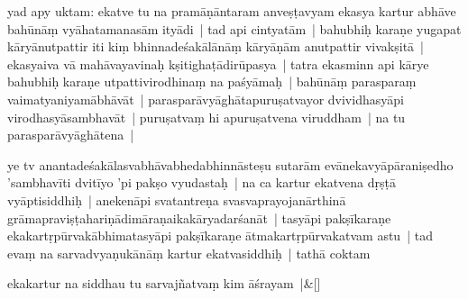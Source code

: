 \documentclass[article,a4paper]{memoir}
\begin{document}
	  \pstart yad apy uktam: \label{ratnakīrtinibandhāvali__36r1NSAZOF4PYRJJ9T4KL5GNBA4}ekatve tu na pramā\-ṇā\-ntaram anveṣṭavyam ekasya kartur abhā\-ve bahū\-nā\-ṃ vyā\-hatamanasā\-m ityā\-di\label{ratnakīrtinibandhāvali__36r1NSAZOF6VPMT1M1P47SSA79H} | \label{ratnakīrtinibandhāvali__36r1NMN5X0PC291R8Q4FO5BKCDN}tad api cintyatā\-m | bahubhiḥ karaṇe yugapat kā\-ryā\-nutpattir iti kiṃ bhinnadeśakā\-lā\-nā\-ṃ kā\-ryā\-ṇā\-m anutpattir vivakṣitā\- | ekasyaiva vā\- mahā\-vayavinaḥ kṣitighaṭā\-dirū\-pasya | tatra ekasminn api kā\-rye bahubhiḥ karaṇe utpattivirodhinaṃ na paśyā\-maḥ | bahū\-nā\-ṃ parasparaṃ vaimatyaniyamā\-bhā\-vā\-t | parasparā\-vyā\-ghā\-tapuruṣatvayor dvividhasyā\-pi virodhasyā\-sambhavā\-t | puruṣatvaṃ hi apuruṣatvena viruddham | na tu parasparā\-vyā\-ghā\-tena |
	\pend
      

	  \pstart ye tv anantadeśakā\-lasvabhā\-vabhedabhinnā\-steṣu sutarā\-m evā\-nekavyā\-pā\-raniṣedho 'sambhavī\-ti dvitī\-yo 'pi pakṣo vyudastaḥ | na ca kartur ekatvena dṛṣṭā\- vyā\-ptisiddhiḥ |  anekenā\-pi svatantreṇa svasvaprayojanā\-rthinā\- grā\-mapraviṣṭahariṇā\-dimā\-raṇaikakā\-ryadarśanā\-t | tasyā\-pi pakṣī\-karaṇe ekakartṛpū\-rvakā\-bhimatasyā\-pi pakṣī\-karaṇe ā\-tmakartṛpū\-rvakatvam astu | tad evaṃ na sarvadvyaṇukā\-nā\-ṃ kartur ekatvasiddhiḥ | \label{ratnakīrtinibandhāvali__36r1NMMFX7IAGR5V3DIY9Q16BLF}tathā\- coktam
	\pend
      
	    
	    \stanza[\smallbreak]
ekakartur na siddhau tu sarvajñatvaṃ kim ā\-śrayam |\label{ratnakīrtinibandhāvali__36r1NMFLNZF26QG3OB18MFYZVHQ}\&[\smallbreak]
\end{document}
